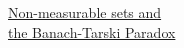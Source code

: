 \documentclass[preview]{standalone}
\begin{document}
\begin{center}
\underline{Non-measurable sets and \\ the Banach-Tarski Paradox}
\end{center}
\end{document}

